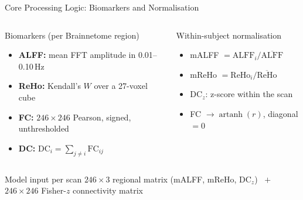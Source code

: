 \documentclass[aspectratio=169,11pt]{beamer}
\begin{document}
\begin{frame}{Core Processing Logic: Biomarkers and Normalisation}
  \begin{columns}[T,onlytextwidth]
      \begin{block}{Biomarkers (per Brainnetome region)}
        \small
        \begin{itemize}
          \item \textbf{ALFF:} mean FFT amplitude in 0.01--0.10\,Hz
          \item \textbf{ReHo:} Kendall's $W$ over a 27-voxel cube
          \item \textbf{FC:} $246\times246$ Pearson, signed, unthresholded
          \item \textbf{DC:} $\mathrm{DC}_i=\sum_{j\ne i}\mathrm{FC}_{ij}$
        \end{itemize}
      \end{block}
      \begin{block}{Within-subject normalisation}
        \small
        \begin{itemize}
          \item mALFF $=\mathrm{ALFF}_i/\overline{\mathrm{ALFF}}$
          \item mReHo $=\mathrm{ReHo}_i/\overline{\mathrm{ReHo}}$
          \item DC$_z$: z-score within the scan
          \item FC $\rightarrow \operatorname{artanh}(r)$, diagonal $=0$
        \end{itemize}
      \end{block}
  \end{columns}
  \vspace{0.3cm}
  \begin{alertblock}{Model input per scan}
    \centering $246\times3$ regional matrix (mALFF, mReHo, DC$_z$) $\;+\;$
    $246\times246$ Fisher-$z$ connectivity matrix
  \end{alertblock}
\end{frame}
\end{document}
